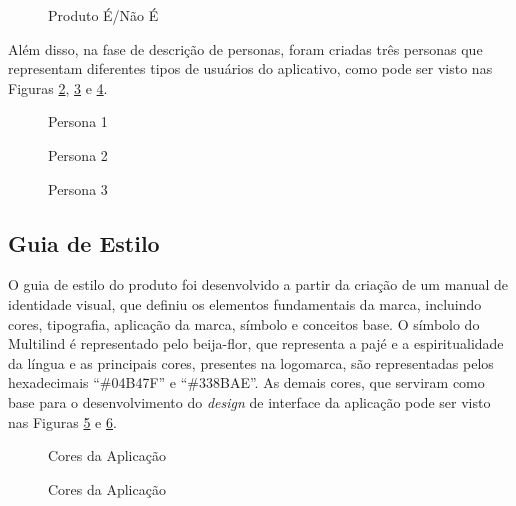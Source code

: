 \begin{figure}[h!]
	\centering
	\caption{Produto É/Não É}
	\label{fig12}
\end{figure}

Além disso, na fase de descrição de personas, foram criadas três personas que representam diferentes tipos de usuários do aplicativo, como pode ser visto nas Figuras \ref{fig13}, \ref{fig14} e \ref{fig15}.

\begin{figure}[h!]
	\centering
	\caption{Persona 1}
	\label{fig13}
\end{figure}

\begin{figure}[h!]
	\centering
	\caption{Persona 2}
	\label{fig14}
\end{figure}

\begin{figure}[h!]
	\centering
	\caption{Persona 3}
	\label{fig15}
\end{figure}

\subsection{Guia de Estilo}
\label{Guia de Estilo}
O guia de estilo do produto foi desenvolvido a partir da criação de um manual de identidade visual, que definiu os elementos fundamentais da marca, incluindo cores, tipografia, aplicação da marca, símbolo e conceitos base. 
O símbolo do Multilind é representado pelo beija-flor, que representa a pajé e a espiritualidade da língua e as principais cores, presentes na logomarca, são representadas pelos hexadecimais “\#04B47F” e “\#338BAE”.
As demais cores, que serviram como base para o desenvolvimento do \textit{design} de interface da aplicação pode ser visto nas Figuras \ref{fig16} e \ref{fig17}.

\begin{figure}[h!]
	\centering
	\caption{Cores da Aplicação}
	\label{fig16}
\end{figure}

\begin{figure}[h!]
	\centering
	\caption{Cores da Aplicação}
	\label{fig17}
\end{figure}

